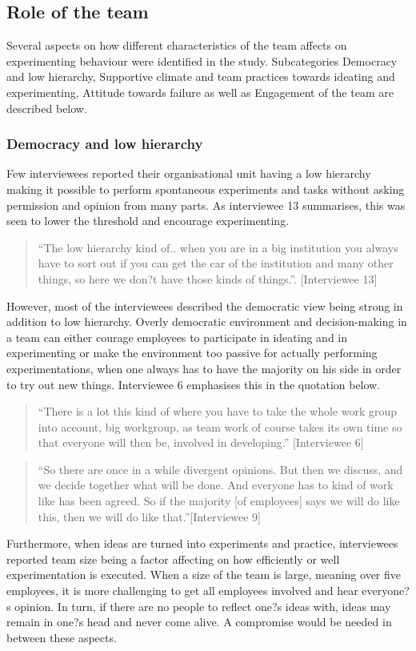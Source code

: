 \subsection{Role of the team}
Several aspects on how different characteristics of the team affects on experimenting behaviour were identified in the study. Subcategories Democracy and low hierarchy, Supportive climate and team practices towards ideating and experimenting, Attitude towards failure as well as Engagement of the team are described below.

\subsubsection{Democracy and low hierarchy}
Few interviewees reported their organisational unit having a low hierarchy making it possible to perform spontaneous experiments and tasks without asking permission and opinion from many parts. As interviewee 13 summarises, this was seen to lower the threshold and encourage experimenting.
\begin{quote}
``The low hierarchy kind of.. when you are in a big institution you always have to sort out if you can get the car of the institution and many other things, so here we don?t have those kinds of things.''. [Interviewee 13]
\end{quote}
However, most of the interviewees described the democratic view being strong in addition to low hierarchy. Overly democratic environment and decision-making in a team can either courage employees to participate in ideating and in experimenting or make the environment too passive for actually performing experimentations, when one always has to have the majority on his side in order to try out new things. Interviewee 6 emphasises this in the quotation below. 
\begin{quote}
``There is a lot this kind of where you have to take the whole work group into account, big workgroup, as team work of course takes its own time so that everyone will then be, involved in developing.'' [Interviewee 6]
\end{quote}
\begin{quote}
``So there are once in a while divergent opinions. But then we discuss, and we decide together what will be done. And everyone has to kind of work like has been agreed. So if the majority [of employees] says we will do like this, then we will do like that.''[Interviewee 9]
\end{quote}
Furthermore, when ideas are turned into experiments and practice, interviewees reported team size being a factor affecting on how efficiently or well experimentation is executed. When a size of the team is large, meaning over five employees, it is more challenging to get all employees involved and hear everyone?s opinion. In turn, if there are no people to reflect one?s ideas with, ideas may remain in one?s head and never come alive. A compromise would be needed in between these aspects. 

